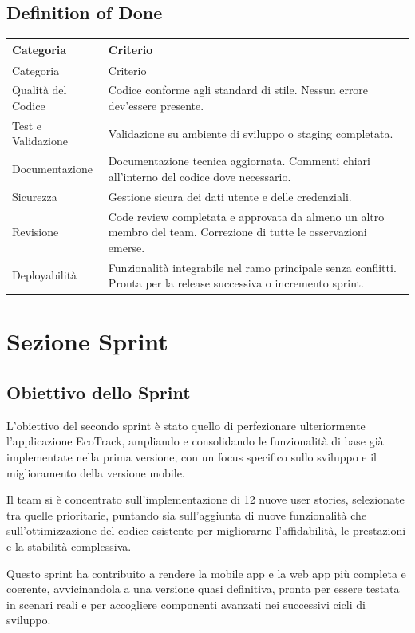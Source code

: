 \subsection{Definition of Done}
\begin{longtable}{p{3cm}p{11cm}}
\toprule
Categoria & Criterio \\
\midrule
\endfirsthead
\toprule
Categoria & Criterio \\
\midrule
\endhead
Qualità del Codice & Codice conforme agli standard di stile. Nessun errore dev'essere presente. \\
Test e Validazione & Validazione su ambiente di sviluppo o staging completata. \\
Documentazione & Documentazione tecnica aggiornata. Commenti chiari all'interno del codice dove necessario. \\
Sicurezza & Gestione sicura dei dati utente e delle credenziali. \\
Revisione & Code review completata e approvata da almeno un altro membro del team. Correzione di tutte le osservazioni emerse. \\
Deployabilità & Funzionalità integrabile nel ramo principale senza conflitti. Pronta per la release successiva o incremento sprint. \\
\bottomrule
\end{longtable}

\section{Sezione Sprint}
\subsection{Obiettivo dello Sprint}
L’obiettivo del secondo sprint è stato quello di perfezionare ulteriormente l’applicazione EcoTrack, ampliando e consolidando le funzionalità di base già implementate nella prima versione, con un focus specifico sullo sviluppo e il miglioramento della versione mobile.

 Il team si è concentrato sull’implementazione di 12 nuove user stories, selezionate tra quelle prioritarie, puntando sia sull’aggiunta di nuove funzionalità che sull’ottimizzazione del codice esistente per migliorarne l’affidabilità, le prestazioni e la stabilità complessiva.


 Questo sprint ha contribuito a rendere la mobile app e la web app più completa e coerente, avvicinandola a una versione quasi definitiva, pronta per essere testata in scenari reali e per accogliere componenti avanzati nei successivi cicli di sviluppo. 


